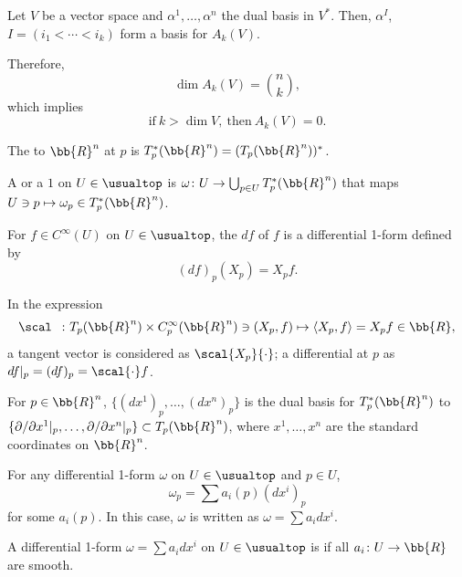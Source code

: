 Let $V$ be a vector space and $\alpha^1,\dotsc,\alpha^n$ the dual basis in $V^*$. Then, $\alpha^I$, $I = (i_1 < \dotsb < i_k)$ form a basis for $A_k(V)$.

Therefore,
\[
\dim A_k(V) = \binom{n}{k},
\]
which implies
\[
\text{if}\ k > \dim V,\ \text{then}\ A_k(V) = 0.
\]

The  to $\bb{R}^n$ at $p$ is $T^*_p (\bb{R}^n) = (T_p(\bb{R}^n))^*$.

A  or a  $1$ on $U \in \usualtop$ is $\omega \colon U \to \bigcup_{p \in U} T^*_p (\bb{R}^n)$ that maps $U \ni p \mapsto \omega_p \in T^*_p (\bb{R}^n)$.

For $f \in C^\infty (U)$ on $U \in \usualtop$, the  $df$ of $f$ is a differential 1-form defined by
\[
(df)_p (X_p) = X_p f.
\]


In the expression
\[
\scal\ \  \colon T_p(\bb{R}^n) \times C^\infty_p (\bb{R}^n) \ni (X_p, f) \mapsto \langle X_p, f \rangle = X_p f \in \bb{R},
\]
a tangent vector is considered as $\scal{X_p}{\cdot}$; a differential at $p$ as $df|_p = (df)_p = \scal{\cdot}f$.


For $p \in \bb{R}^n$, $\{ (dx^1)_p, \dotsc, (dx^n)_p \} $ is the dual basis for $T_p^* (\bb{R}^n)$ to $\{ \partial / \partial x^1|_p, \dotsc, \partial/\partial x^n|_p \} \subset T_p (\bb{R}^n)$, where $x^1, \dotsc, x^n$ are the standard coordinates on $\bb{R}^n$.

For any differential 1-form $\omega$ on $U \in \usualtop$ and $p \in U$,
\[
\omega_p = \sum a_i(p) (dx^i)_p
\]
for some $a_i (p)$. In this case, $\omega$ is written as $\omega = \sum a_i dx^i$.

A differential 1-form $\omega = \sum a_i dx^i$ on $U \in \usualtop$ is  if all $a_i \colon U \to \bb{R}$ are smooth.


